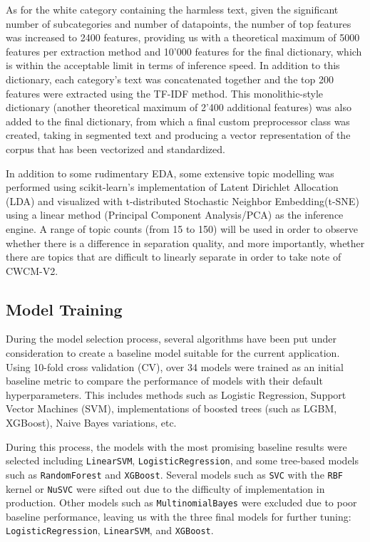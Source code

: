 \documentclass[
  titlepage]{article}
\begin{document}
As for the white category containing the harmless text, given the
significant number of subcategories and number of datapoints, the number
of top features was increased to 2400 features, providing us with a
theoretical maximum of 5000 features per extraction method and 10'000
features for the final dictionary, which is within the acceptable limit
in terms of inference speed. In addition to this dictionary, each
category's text was concatenated together and the top 200 features were
extracted using the TF-IDF method. This monolithic-style dictionary
(another theoretical maximum of 2'400 additional features) was also
added to the final dictionary, from which a final custom preprocessor
class was created, taking in segmented text and producing a vector
representation of the corpus that has been vectorized and standardized.

In addition to some rudimentary EDA, some extensive topic modelling was
performed using scikit-learn's implementation of Latent Dirichlet
Allocation (LDA) and visualized with t-distributed Stochastic Neighbor
Embedding(t-SNE) using a linear method (Principal Component
Analysis/PCA) as the inference engine. A range of topic counts (from 15
to 150) will be used in order to observe whether there is a difference
in separation quality, and more importantly, whether there are topics
that are difficult to linearly separate in order to take note of
CWCM-V2.

\subsection{Model Training}\label{model-training}

During the model selection process, several algorithms have been put
under consideration to create a baseline model suitable for the current
application. Using 10-fold cross validation (CV), over 34 models were
trained as an initial baseline metric to compare the performance of
models with their default hyperparameters. This includes methods such as
Logistic Regression, Support Vector Machines (SVM), implementations of
boosted trees (such as LGBM, XGBoost), Naive Bayes variations, etc.

During this process, the models with the most promising baseline results
were selected including \texttt{LinearSVM}, \texttt{LogisticRegression},
and some tree-based models such as \texttt{RandomForest} and
\texttt{XGBoost}. Several models such as \texttt{SVC} with the
\texttt{RBF} kernel or \texttt{NuSVC} were sifted out due to the
difficulty of implementation in production. Other models such as
\texttt{MultinomialBayes} were excluded due to poor baseline
performance, leaving us with the three final models for further tuning:
\texttt{LogisticRegression}, \texttt{LinearSVM}, and \texttt{XGBoost}.
\end{document}
